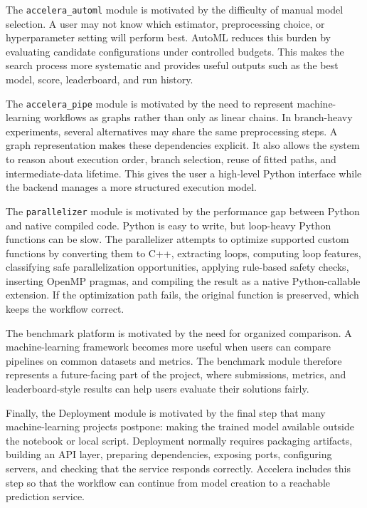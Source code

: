 \documentclass[12pt,a4paper]{report}
\begin{document}
\medskip
\noindent The \texttt{accelera\_automl} module is motivated by the difficulty of manual
model selection. A user may not know which estimator, preprocessing choice, or
hyperparameter setting will perform best. AutoML reduces this burden by
evaluating candidate configurations under controlled budgets. This makes the
search process more systematic and provides useful outputs such as the best
model, score, leaderboard, and run history.

\medskip
\noindent The \texttt{accelera\_pipe} module is motivated by the need to represent
machine-learning workflows as graphs rather than only as linear chains. In
branch-heavy experiments, several alternatives may share the same preprocessing
steps. A graph representation makes these dependencies explicit. It also allows
the system to reason about execution order, branch selection, reuse of fitted
paths, and intermediate-data lifetime. This gives the user a high-level Python
interface while the backend manages a more structured execution model.

\medskip
\noindent The \texttt{parallelizer} module is motivated by the performance gap between
Python and native compiled code. Python is easy to write, but loop-heavy Python
functions can be slow. The parallelizer attempts to optimize supported custom
functions by converting them to C++, extracting loops, computing loop features,
classifying safe parallelization opportunities, applying rule-based safety
checks, inserting OpenMP pragmas, and compiling the result as a native
Python-callable extension. If the optimization path fails, the original function
is preserved, which keeps the workflow correct.

The benchmark platform is motivated by the need for organized
comparison. A machine-learning framework becomes more useful when users can
compare pipelines on common datasets and metrics. The benchmark module therefore
represents a future-facing part of the project, where submissions, metrics, and
leaderboard-style results can help users evaluate their solutions fairly.

Finally, the Deployment module is motivated by the final step that many
machine-learning projects postpone: making the trained model available outside
the notebook or local script. Deployment normally requires packaging artifacts,
building an API layer, preparing dependencies, exposing ports, configuring
servers, and checking that the service responds correctly. Accelera includes
this step so that the workflow can continue from model creation to a reachable
prediction service.
\end{document}

